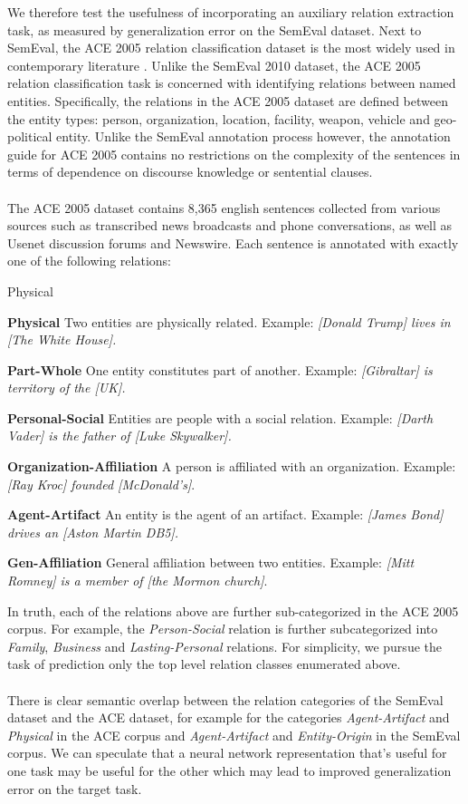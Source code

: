 We therefore test the usefulness of incorporating an auxiliary relation extraction task, as measured by generalization error on the SemEval dataset. Next to SemEval, the ACE 2005 relation classification dataset is the most widely used in contemporary literature  \citep{walker2006}. Unlike the SemEval 2010 dataset, the ACE 2005 relation classification task is concerned with identifying relations between named entities. Specifically, the relations in the ACE 2005 dataset are defined between the entity types: person, organization, location, facility, weapon, vehicle and geo-political entity. Unlike the SemEval annotation process however, the annotation guide for ACE 2005  contains no restrictions on the complexity of the sentences in terms of dependence on discourse knowledge or sentential clauses.
\\\\
The ACE 2005 dataset contains 8,365 english sentences collected from various sources such as transcribed news broadcasts and phone conversations, as well as Usenet discussion forums and Newswire. Each sentence is annotated with exactly one of the following relations:
\begin{labeling}{Physical}
	\item \textbf{Physical} Two entities are physically related. Example: \textit{[Donald Trump] lives in [The White House].}
	\item \textbf{Part-Whole} One entity constitutes part of another. Example: \textit{[Gibraltar] is territory of the [UK].}
	\item \textbf{Personal-Social} Entities are people with a social relation. Example: \textit{[Darth Vader] is the father of [Luke Skywalker].}
	\item \textbf{Organization-Affiliation} A person is affiliated with an organization. Example: \textit{[Ray Kroc] founded [McDonald's]}.
	\item \textbf{Agent-Artifact} An entity is the agent of an artifact. Example: \textit{[James Bond] drives an [Aston Martin DB5].}
	\item \textbf{Gen-Affiliation} General affiliation between two entities. Example: \textit{[Mitt Romney] is a member of [the Mormon church]}.
\end{labeling}
In truth, each of the relations above are further sub-categorized in the ACE 2005 corpus. For example, the \textit{Person-Social} relation is further subcategorized into \textit{Family}, \textit{Business} and \textit{Lasting-Personal} relations. For simplicity, we pursue the task of prediction only the top level relation classes enumerated above.
\\\\
There is clear semantic overlap between the relation categories of the SemEval dataset and the ACE dataset, for example for the categories \textit{Agent-Artifact} and \textit{Physical} in the ACE corpus and \textit{Agent-Artifact} and \textit{Entity-Origin} in the SemEval corpus. We can speculate that a neural network representation that's useful for one task may be useful for the other which may lead to improved generalization error on the target task. 

